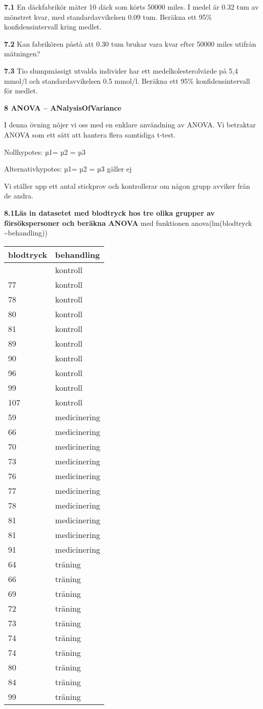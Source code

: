 \documentclass[
  letterpaper,
  DIV=11,
  numbers=noendperiod]{scrartcl}
\begin{document}
\textbf{7.1} En däckfabrikör mäter 10 däck som körts 50000 miles. I
medel är 0.32 tum av mönstret kvar, med standardavvikelsen 0.09 tum.
Beräkna ett 95\% konfidensintervall kring medlet.

\textbf{7.2} Kan fabrikören påstå att 0.30 tum brukar vara kvar efter
50000 miles utifrån mätningen?

\textbf{7.3} Tio slumpmässigt utvalda individer har ett
medelkolesterolvärde på 5,4 mmol/l och standardavvikelsen 0.5 mmol/l.
Beräkna ett 95\% konfidensintervall för medlet.

\textbf{8 ANOVA -- ANalysisOfVariance}

I denna övning nöjer vi oss med en enklare användning av ANOVA. Vi
betraktar ANOVA som ett sätt att hantera flera samtidiga t-test.

Nollhypotes: µ1= µ2 = µ3

Alternativhypotes: µ1= µ2 = µ3 gäller ej

Vi ställer upp ett antal stickprov och kontrollerar om någon grupp
avviker från de andra.

\textbf{8.1Läs in datasetet med blodtryck hos tre olika grupper av
försökspersoner och beräkna ANOVA} med funktionen anova(lm(blodtryck
\textasciitilde behandling))

\begin{longtable}[]{@{}ll@{}}
\toprule\noalign{}
blodtryck & behandling \\
\midrule\noalign{}
\endhead
\bottomrule\noalign{}
\endlastfoot
77 & kontroll \\
77 & kontroll \\
78 & kontroll \\
80 & kontroll \\
81 & kontroll \\
89 & kontroll \\
90 & kontroll \\
96 & kontroll \\
99 & kontroll \\
107 & kontroll \\
59 & medicinering \\
66 & medicinering \\
70 & medicinering \\
73 & medicinering \\
76 & medicinering \\
77 & medicinering \\
78 & medicinering \\
81 & medicinering \\
81 & medicinering \\
91 & medicinering \\
64 & träning \\
66 & träning \\
69 & träning \\
72 & träning \\
73 & träning \\
74 & träning \\
74 & träning \\
80 & träning \\
84 & träning \\
99 & träning \\
\end{longtable}
\end{document}
